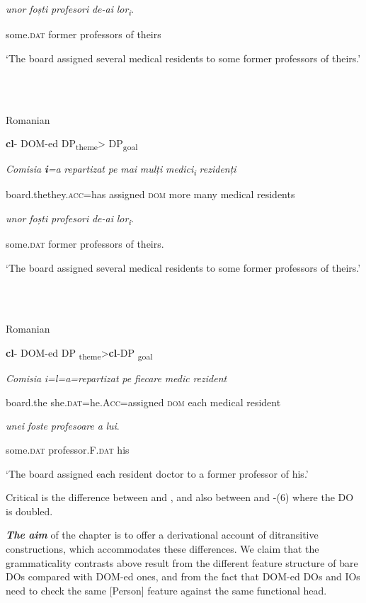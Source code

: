 \documentclass[output=paper,colorlinks,citecolor=brown]{./langscibook}
\begin{document}
\textit{unor}    \textit{foști}  \textit{profesori}  \textit{de-ai} \textit{lor\textsubscript{i}}.

some.\textsc{dat}  former professors   of theirs

‘The board assigned several medical residents to some former professors of theirs.’

\ea%
    \label{ex:key:5}
    \gll\\
        \\
    \glt
    \z

          Romanian

\textbf{cl}{}- DOM-ed DP\textsubscript{theme}> DP\textsubscript{goal}

\textit{Comisia}  \textbf{\textit{i}}\textit{=a} \textit{repartizat}    \textit{pe}  \textit{mai}  \textit{mulți}  \textit{medici\textsubscript{i}    }\textit{rezidenți}

board.thethey.\textsc{acc=}has assigned   \textsc{dom} more many medical residents

\textit{unor}     \textit{foști}          \textit{profesori}    \textit{de-ai} \textit{lor\textsubscript{i}}.

some.\textsc{dat} former     professors   of theirs.

‘The board assigned several medical residents to some former professors of theirs.’

\ea%
    \label{ex:key:6}
    \gll\\
        \\
    \glt
    \z

          Romanian

\textbf{cl}{}- DOM-ed DP \textsubscript{theme}>\textbf{cl}{}-DP \textsubscript{goal} 

\textit{Comisia}  \textit{i=l=a=repartizat}      \textit{pe} \textit{fiecare} \textit{medic} \textit{rezident}

board.the  she.\textsc{dat}=he.\textsc{Acc}=assigned \textsc{dom} each medical resident 

\textit{unei} \textit{foste} \textit{profesoare}    \textit{a} \textit{lui}.

some.\textsc{dat} professor.F.\textsc{dat}  his

‘The board assigned each resident doctor to a former professor of his.’

Critical is the difference between  and , and also between  and -(6) where the DO is doubled.

\textbf{\textit{The} \textit{aim} }of the chapter is to offer a derivational account of ditransitive constructions, which accommodates these differences. We claim that the grammaticality contrasts above result from the different feature structure of bare DOs compared with DOM-ed ones, and from the fact that DOM-ed DOs and IOs need to check the same [Person] feature against the same functional head.
\end{document}
